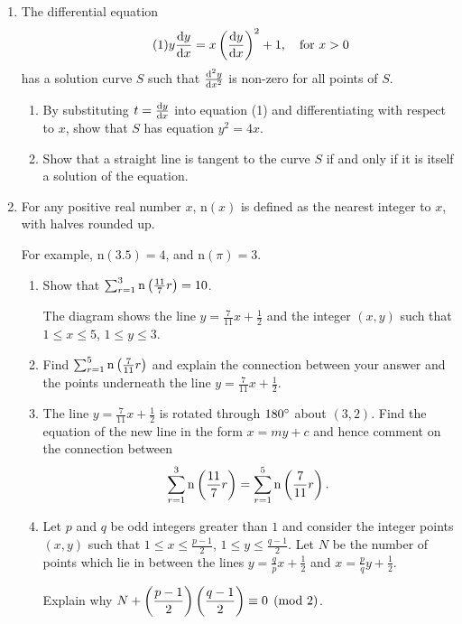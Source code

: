 \begin{enumerate}
\item The differential equation
\begin{equation*}\tag{1}
y\dv{y}{x}=x\left(\dv{y}{x}\right)^2+1, \quad \text{for }x>0
\end{equation*}
has a solution curve $S$ such that $\dv[2]{y}{x}$ is non-zero for all points of $S$.
\begin{enumerate}[label=(\roman*)]
\item By substituting $t=\dv{y}{x}$ into equation (1) and differentiating with respect to $x$, show that $S$ has equation $y^2=4x$.
\item Show that a straight line is tangent to the curve $S$ if and only if it is itself a solution of the equation.
\end{enumerate}

\item For any positive real number $x$, $\mathrm{n}(x)$ is defined as the nearest integer to $x$, with halves rounded up.

For example, $\mathrm{n}(3.5)=4$, and $\mathrm{n}(\pi)=3$.

\begin{enumerate}[label=(\alph*)]
\item Show that $\sum_{r=1}^3\mathrm{n}\left(\frac{11}{7}r\right)=10$.

The diagram shows the line $y=\frac{7}{11}x+\frac{1}{2}$ and the integer $(x,y)$ such that $1\le x\le 5$, $1\le y\le 3$.

\item Find $\sum_{r=1}^5\mathrm{n}\left(\frac{7}{11}r\right)$ and explain the connection between your answer and the points underneath the line $y=\frac{7}{11}x+\frac{1}{2}$.

\item The line $y=\frac{7}{11}x+\frac{1}{2}$ is rotated through $180\degree$ about $(3,2)$. Find the equation of the new line in the form $x=my+c$ and hence comment on the connection between
\[ \sum_{r=1}^3\mathrm{n}\left(\frac{11}{7}r\right)=\sum_{r=1}^5\mathrm{n}\left(\frac{7}{11}r\right). \]

\item Let $p$ and $q$ be odd integers greater than $1$ and consider the integer points $(x,y)$ such that $1\le x\le\frac{p-1}{2}$, $1\le y\le\frac{q-1}{2}$. Let $N$ be the number of points which lie in between the lines $y=\frac{q}{p}x+\frac{1}{2}$ and $x=\frac{p}{q}y+\frac{1}{2}$.

Explain why $\displaystyle N+\left(\frac{p-1}{2}\right)\left(\frac{q-1}{2}\right)\equiv0\pmod2$.
\end{enumerate}
\end{enumerate}
\pagebreak

